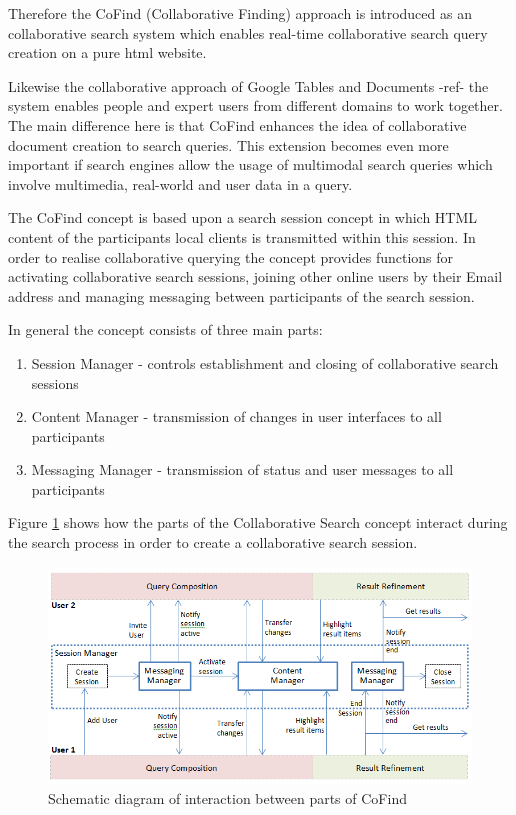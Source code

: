 \documentclass[runningheads,a4paper]{llncs} \usepackage[utf8]{inputenc}
\begin{document}
Therefore the CoFind (Collaborative Finding) approach is introduced as an
collaborative search system which enables real-time collaborative search query
creation on a pure html website.

Likewise the collaborative approach of Google Tables and Documents -ref- the
system enables people and expert users from different domains to work together.
The main difference here is that CoFind enhances the idea of collaborative document
creation to search queries. This extension becomes even more important if
search engines allow the usage of multimodal search queries which
involve multimedia, real-world and user data in a query. 

The CoFind concept is based upon a search session concept in which HTML content
of the participants local clients is transmitted within this session.
In order to realise collaborative querying the concept provides functions for
activating collaborative search sessions, joining other online users by their
Email address and managing messaging between participants of the search session.

In general the concept consists of three main parts:
\begin{enumerate}
  \item Session Manager - controls establishment and closing of collaborative
  search sessions
  \item Content Manager - transmission of changes in user interfaces to all
  participants
  \item Messaging Manager - transmission of status and user messages to all
  participants
\end{enumerate}

Figure \ref{fig:cofind} shows how the parts of the Collaborative Search concept
interact during the search process in order to create a collaborative search session.

\begin{figure}[h!]
  \centering
    \includegraphics[width=0.8\linewidth]{resources/cofind-workflow.png}
  \caption{Schematic diagram of interaction between parts of CoFind}
  \label{fig:cofind}
\end{figure}
 
\end{document}

